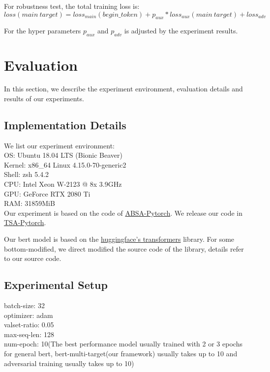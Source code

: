 \documentclass[fyp]{socreport}
\begin{document}
For robustness test, the total training loss is:  
\begin{equation}
    loss(main\ target)=loss_{main}(begin\_{token})+p_{aux}*loss_{aux}(main\ target)+loss_{adv}
\end{equation}


For the hyper parameters $p_{aux}$ and $p_{adv}$ is adjusted by the experiment results.

\chapter{Evaluation}
In this section, we describe the experiment environment, evaluation details and results of our experiments.

\section{Implementation Details}

We list our experiment environment: \\
OS: Ubuntu 18.04 LTS (Bionic Beaver)\\
Kernel: x86\_64 Linux 4.15.0-70-generic2\\
Shell: zsh 5.4.2\\
CPU: Intel Xeon W-2123 @ 8x 3.9GHz\\
GPU: GeForce RTX 2080 Ti\\
RAM: 31859MiB \\




Our experiment is based on the code of \href{https://github.com/songyouwei/ABSA-PyTorch}{ABSA-Pytorch}. We release our code in \href{https://github.com/Xiang-Pan/TSA-PyTorch}{TSA-Pytorch}.

Our bert model is based on the \href{https://github.com/huggingface/transformers}{huggingface's transformers} library. For some bottom-modified, we direct modified the source code of the library, details refer to our source code.

\section{Experimental Setup}

batch-size: 32\\
optimizer: adam\\
valset-ratio: 0.05\\
max-seq-len: 128\\
num-epoch: 10(The best performance model usually trained with 2 or 3 epochs for general bert, bert-multi-target(our framework) usually takes up to 10 and adversarial training usually takes up to 10)\\
\end{document}
